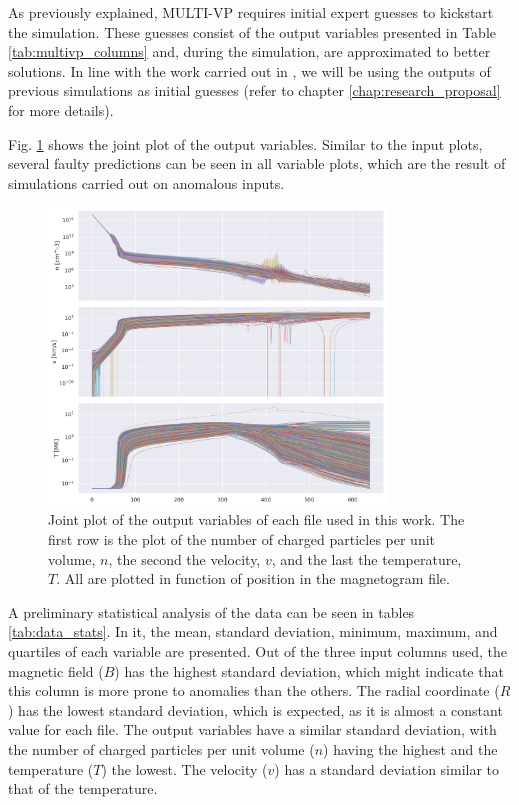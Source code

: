 As previously explained, MULTI-VP requires initial expert guesses to kickstart the simulation. These guesses consist of the output variables presented in Table \ref{tab:multivp_columns} and, during the simulation, are approximated to better solutions. In line with the work carried out in \cite{barros_InitialConditionEstimation_}, we will be using the outputs of previous simulations as initial guesses (refer to chapter \ref{chap:research_proposal} for more details).


Fig. \ref{fig:jointplot_output} shows the joint plot of the output variables. Similar to the input plots, several faulty predictions can be seen in all variable plots, which are the result of simulations carried out on anomalous inputs.

\begin{figure}
    \centering
    \includegraphics[width=0.8\textwidth]{figures/joint_output_cols.png}
    \caption{Joint plot of the output variables of each file used in this work. The first row is the plot of the number of charged particles per unit volume, $n$, the second the velocity, $v$, and the last the temperature, $T$. All are plotted in function of position in the magnetogram file.}
    \label{fig:jointplot_output}
\end{figure}

A preliminary statistical analysis of the data can be seen in tables \ref{tab:data_stats}. In it, the mean, standard deviation, minimum, maximum, and quartiles of each variable are presented. Out of the three input columns used, the magnetic field ($B$) has the highest standard deviation, which might indicate that this column is more prone to anomalies than the others. The radial coordinate ($R$) has the lowest standard deviation, which is expected, as it is almost a constant value for each file. The output variables have a similar standard deviation, with the number of charged particles per unit volume ($n$) having the highest and the temperature ($T$) the lowest. The velocity ($v$) has a standard deviation similar to that of the temperature.

